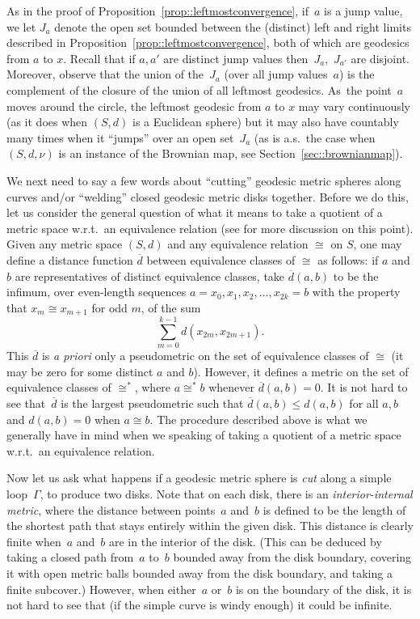 \documentclass[10pt]{amsart}
\theoremstyle{plain}
\numberwithin{theorem}{section}
\theoremstyle{definition}
\let\ol\overline
\begin{document}
As in the proof of Proposition~\ref{prop::leftmostconvergence}, if~$a$ is a jump value, we let $J_a$ denote the open set bounded between the (distinct) left and right limits described in Proposition~\ref{prop::leftmostconvergence}, both of which are geodesics from $a$ to $x$. Recall that if $a,a'$ are distinct jump values then~$J_a$,~$J_{a'}$ are disjoint. Moreover, observe that the union of the~$J_a$ (over all jump values~$a$) is the complement of the closure of the union of all leftmost geodesics. As~the point~$a$ moves around the circle, the leftmost geodesic from $a$ to $x$ may vary continuously (as it does when $(S,d)$ is a Euclidean sphere) but it may also have countably many times when it ``jumps'' over an open set~$J_a$ (as is a.s.\ the case when $(S,d, \nu)$ is an instance of the Brownian map, see Section~\ref{sec::brownianmap}).\enlargethispage{.5\baselineskip}%

We next need to say a few words about ``cutting'' geodesic metric spheres along curves and/or ``welding'' closed geodesic metric disks together. Before we do this, let us consider the general question of what it means to take a quotient of a metric space w.r.t.\ an equivalence relation (see \cite[Chap.\,3]{courseinmetricgeometry} for more discussion on this point). Given any metric space $(S,d)$ and any equivalence relation $\cong$ on $S$, one may define a distance function $\ol{d}$ between equivalence classes of $\cong$ as follows: if $a$ and $b$ are representatives of distinct equivalence classes, take $\ol{d}(a,b)$ to be the infimum, over even-length sequences $a = x_0, x_1, x_2, \ldots, x_{2k} = b$ with the property that $x_m \cong x_{m+1}$ for odd $m$, of the sum\vspace*{-3pt}
\[
\sum_{m=0}^{k-1} d(x_{2m}, x_{2m+1}).
\]
This $\ol{d}$ is \emph{a priori} only a pseudometric on the set of equivalence classes of $\cong$ (\ie it may be zero for some distinct $a$ and $b$). However, it defines a metric on the set of equivalence classes of $\cong^*$, where $a \cong^* b$ whenever $\ol{d}(a,b) = 0$. It is not hard to see that~$\ol{d}$ is the largest pseudometric such that $\ol{d}(a,b) \leq d(a,b)$ for all $a,b$ and $d(a,b) = 0$ when $a \cong b$. The procedure described above is what we generally have in mind when we speaking of taking a quotient of a metric space w.r.t.\ an equivalence relation.

Now let us ask what happens if a geodesic metric sphere is \emph{cut} along a simple loop~$\Gamma$, to produce two disks. Note that on each disk, there is an \emph{interior-internal metric}, where the distance between points~$a$ and~$b$ is defined to be the length of the shortest path that stays entirely within the given disk. This distance is clearly finite when~$a$ and~$b$ are in the interior of the disk. (This can be deduced by taking a closed path from~$a$ to~$b$ bounded away from the disk boundary, covering it with open metric balls bounded away from the disk boundary, and taking a finite subcover.) However, when either~$a$ or~$b$ is on the boundary of the disk, it is not hard to see that (if the simple curve is windy enough) it could be infinite.
\end{document}
